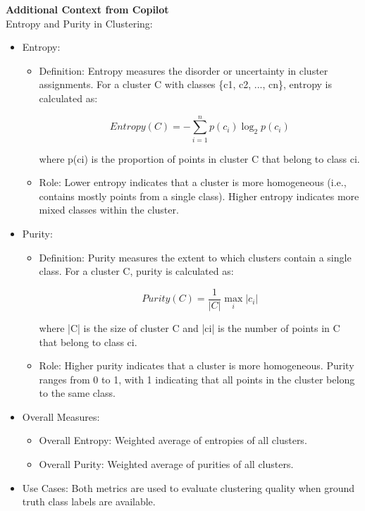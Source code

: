 \begin{framed}
\textbf{Additional Context from Copilot}\\
Entropy and Purity in Clustering:

\begin{itemize}
\item Entropy:

\begin{itemize}
\item Definition: Entropy measures the disorder or uncertainty in cluster assignments. For a cluster C with classes \{c1, c2, ..., cn\}, entropy is calculated as:

\begin{equation}
Entropy(C) = - \sum_{i=1}^{n} p(c_i) \log_2 p(c_i)
\end{equation}


where p(ci) is the proportion of points in cluster C that belong to class ci.


\item Role: Lower entropy indicates that a cluster is more homogeneous (i.e., contains mostly points from a single class). Higher entropy indicates more mixed classes within the cluster.
\end{itemize}


\item Purity:

\begin{itemize}
\item Definition: Purity measures the extent to which clusters contain a single class. For a cluster C, purity is calculated as:

\begin{equation}
Purity(C) = \frac{1}{|C|} \max_{i} |c_i|
\end{equation}


where |C| is the size of cluster C and |ci| is the number of points in C that belong to class ci.


\item Role: Higher purity indicates that a cluster is more homogeneous. Purity ranges from 0 to 1, with 1 indicating that all points in the cluster belong to the same class.
\end{itemize}


\item Overall Measures:

\begin{itemize}
\item Overall Entropy: Weighted average of entropies of all clusters.
\item Overall Purity: Weighted average of purities of all clusters.
\end{itemize}


\item Use Cases: Both metrics are used to evaluate clustering quality when ground truth class labels are available.
\end{itemize}
\end{framed}

